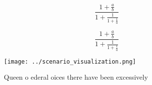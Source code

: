 \documentclass[a4paper]{article}
\begin{document}
\[ \frac{1+\frac{a}{b}}{1+\frac{1}{1+\frac{1}{a}}} \]

\[ \frac{1+\frac{a}{b}}{1+\frac{1}{1+\frac{1}{a}}} \]

\begin{figure}
\centering
\texttt{[image: ../scenario\_visualization.png]}
\caption{Queen o ederal oices there have been excessively 
}
\end{figure}
 
\end{document}
